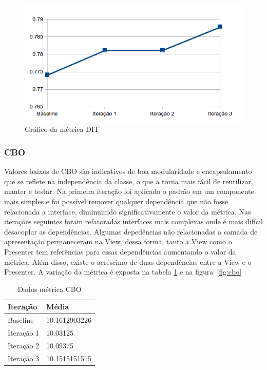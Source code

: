 \documentclass[conference]{IEEEtran}
\begin{document}
\begin{figure}[!htb]
	\begin{center}
		\includegraphics[scale=0.5]{img/dit.png}
	\end{center}
	
	\caption{\label{fig:dit} Gráfico da métrica DIT}   
\end{figure}

\subsubsection{CBO}

Valores baixos de CBO são indicativos de boa modularidade e encapsulamento que
se reflete na independência da classe, o que a torna mais fácil de reutilizar,
manter e testar.
Na primeira iteração foi aplicado o padrão em um componente mais simples e foi
possível remover qualquer dependência que não fosse relacionada a interface,
diminuinido significativamente o valor da métrica. Nas iterações seguintes foram
refatoradas interfaces mais complexas onde é mais difícil desacoplar as
dependências. Algumas depedências não relacionadas a camada de apresentação
permaneceram na View, dessa forma, tanto a View como o Presenter tem referências
para essas dependências aumentando o valor da métrica. Além disso, existe o
acréscimo de duas dependências entre a View e o Presenter. A variação da métrica
é exposta na tabela \ref{tab:cbo} e na figura~\ref{fig:cbo}

\begin{table}[!h]
	\centering
	    \caption{\label{tab:cbo} Dados métrica CBO}
	
    \begin{tabular}{ | l | l | }
    \hline
    Iteração & Média 			\\ \hline
    Baseline & 10.1612903226   	\\ \hline
    Iteração 1 & 10.03125		\\ \hline
	Iteração 2 & 10.09375		\\ \hline
	Iteração 3 & 10.1515151515	\\ \hline
    \end{tabular}
    
\end{table}
\end{document}
